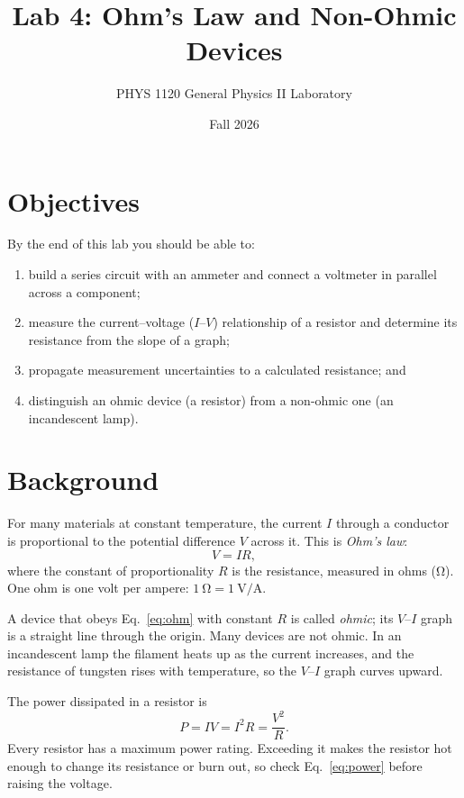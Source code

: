 \documentclass[11pt]{article}
\title{Lab 4: Ohm's Law and Non-Ohmic Devices}
\author{PHYS 1120 \quad General Physics II Laboratory}
\date{Fall 2026}
\begin{document}
\maketitle

\section{Objectives}

By the end of this lab you should be able to:
\begin{enumerate}[label=\arabic*.]
  \item build a series circuit with an ammeter and connect a voltmeter in parallel across a component;
  \item measure the current--voltage ($I$--$V$) relationship of a resistor and determine its resistance from the slope of a graph;
  \item propagate measurement uncertainties to a calculated resistance; and
  \item distinguish an ohmic device (a resistor) from a non-ohmic one (an incandescent lamp).
\end{enumerate}

\section{Background}

For many materials at constant temperature, the current $I$ through a conductor is proportional to the potential difference $V$ across it. This is \emph{Ohm's law}:
\begin{equation}
  V = IR, \label{eq:ohm}
\end{equation}
where the constant of proportionality $R$ is the resistance, measured in ohms (\si{\ohm}). One ohm is one volt per ampere: $\SI{1}{\ohm} = \SI{1}{\volt\per\ampere}$.

A device that obeys Eq.~\eqref{eq:ohm} with constant $R$ is called \emph{ohmic}; its $V$--$I$ graph is a straight line through the origin. Many devices are not ohmic. In an incandescent lamp the filament heats up as the current increases, and the resistance of tungsten rises with temperature, so the $V$--$I$ graph curves upward.

The power dissipated in a resistor is
\begin{equation}
  P = IV = I^2 R = \frac{V^2}{R}. \label{eq:power}
\end{equation}
Every resistor has a maximum power rating. Exceeding it makes the resistor hot enough to change its resistance or burn out, so check Eq.~\eqref{eq:power} before raising the voltage.
\end{document}
